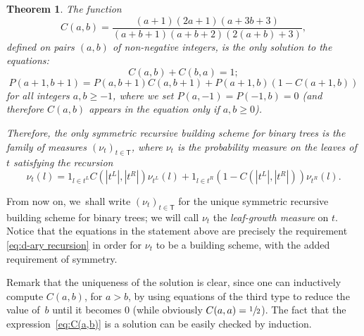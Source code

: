 \documentclass[JEP,XML,SOM,Unicode,NoFloatCountersInSection, NoEqCountersInSection,published]{cedram}
\newcommand{\sT}{\mathsf{T}}
\newtheorem{thm}{Theorem}[section]
\theoremstyle{definition}
\begin{document}
\begin{thm}\label{thm:defmeasurediscrete}The function
\begin{equation}\label{eq:C(a,b)}C(a,b)=\frac{(a+1)(2a+1)(a+3b+3)}{(a+b+1)(a+b+2)(2(a+b)+3)},\end{equation}
defined on pairs $(a,b)$ of non-negative integers, is the only solution to the equations:
\[
C(a,b)+C(b,a)=1;
\]
\[
P(a+1,b+1)=P(a,b+1)C(a,b+1)+P(a+1,b)(1-C(a+1,b))
\]
for all integers $a,b\geq -1$, where we set $P(a,-1)=P(-1,b)=0$ (and therefore $C(a,b)$ appears in the equation only if $a,b\geq 0$).

Therefore, the only symmetric recursive building scheme for binary trees is the family of measures $(\nu_t)_{t\in \sT}$, where $\nu_t$ is the probability measure on the leaves of $t$ satisfying the recursion
\begin{equation}\nu_t(l)=1_{l\in t^L}C(|t^L|,|t^R|)\nu_{t^L}(l)+1_{l\in t^R}(1-C(|t^L|,|t^R|))\nu_{t^R}(l).\label{recursion with C's}\end{equation}
\end{thm}

From now on, we~shall write $(\nu_t)_{t\in \sT}$ for the unique symmetric recursive building scheme for binary trees; we will call $\nu_t$ the \emph{leaf-growth measure} on $t$. Notice that the equations in the statement above are precisely the requirement \eqref{eq:d-ary recursion} in order for $\nu_t$ to be a building scheme, with the added requirement of symmetry.

Remark that the uniqueness of the solution is clear, since one can inductively compute $C(a,b)$, for $a>b$, by using equations of the third type to reduce the value of~$b$ until it becomes $0$ (while obviously $C(a,a)=\sfrac12$). The fact that the expression~\eqref{eq:C(a,b)} is a solution can be easily checked by induction.
\end{document}
